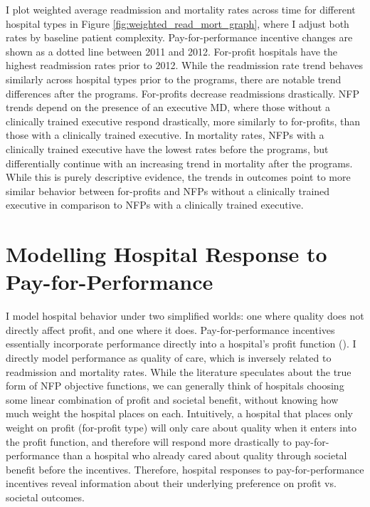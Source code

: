 \documentclass[12pt]{article}
\begin{document}
    I plot weighted average readmission and mortality rates across time for different hospital types in Figure \ref{fig:weighted_read_mort_graph}, where I adjust both rates by baseline patient complexity. Pay-for-performance incentive changes are shown as a dotted line between 2011 and 2012. For-profit hospitals have the highest readmission rates prior to 2012. While the readmission rate trend behaves similarly across hospital types prior to the programs, there are notable trend differences after the programs. For-profits decrease readmissions drastically. NFP trends depend on the presence of an executive MD, where those without a clinically trained executive respond drastically, more similarly to for-profits, than those with a clinically trained executive. In mortality rates, NFPs with a clinically trained executive have the lowest rates before the programs, but differentially continue with an increasing trend in mortality after the programs. While this is purely descriptive evidence, the trends in outcomes point to more similar behavior between for-profits and NFPs without a clinically trained executive in comparison to NFPs with a clinically trained executive.



    \section{Modelling Hospital Response to Pay-for-Performance}\label{sec:model}

    I model hospital behavior under two simplified worlds: one where quality does not directly affect profit, and one where it does. Pay-for-performance incentives essentially incorporate performance directly into a hospital's profit function (\cite{dranove2011health}). I directly model performance as quality of care, which is inversely related to readmission and mortality rates. While the literature speculates about the true form of NFP objective functions, we can generally think of hospitals choosing some linear combination of profit and societal benefit, without knowing how much weight the hospital places on each. Intuitively, a hospital that places only weight on profit (for-profit type) will only care about quality when it enters into the profit function, and therefore will respond more drastically to pay-for-performance than a hospital who already cared about quality through societal benefit before the incentives. Therefore, hospital responses to pay-for-performance incentives reveal information about their underlying preference on profit vs. societal outcomes. 
\end{document}

